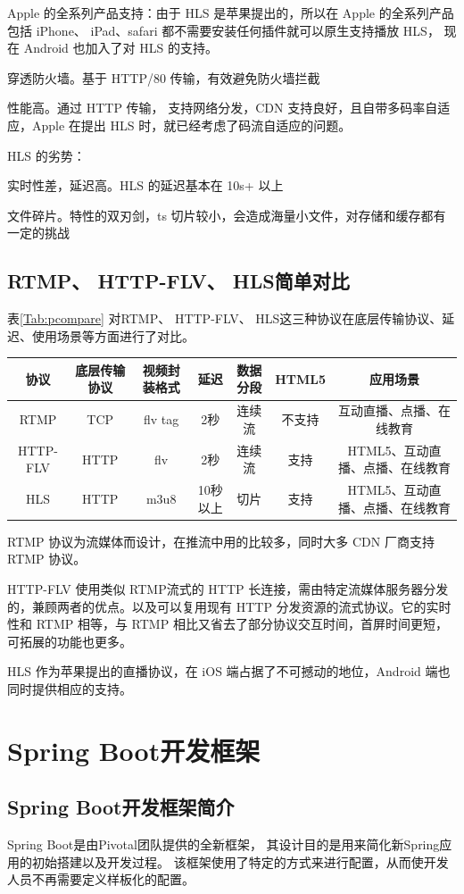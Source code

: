 Apple 的全系列产品支持：由于 HLS 是苹果提出的，所以在 Apple 的全系列产品包括 iPhone、 iPad、safari 都不需要安装任何插件就可以原生支持播放 HLS， 现在 Android 也加入了对 HLS 的支持。

穿透防火墙。基于 HTTP/80 传输，有效避免防火墙拦截

性能高。通过 HTTP 传输， 支持网络分发，CDN 支持良好，且自带多码率自适应，Apple 在提出 HLS 时，就已经考虑了码流自适应的问题。

HLS 的劣势：

实时性差，延迟高。HLS 的延迟基本在 10s+ 以上

文件碎片。特性的双刃剑，ts 切片较小，会造成海量小文件，对存储和缓存都有一定的挑战



\subsection{RTMP、 HTTP-FLV、 HLS简单对比}
表\ref{Tab:pcompare} 对RTMP、 HTTP-FLV、 HLS这三种协议在底层传输协议、延迟、使用场景等方面进行了对比。

\begin{tabular}{ccccccc}
    \caption{RTMP、 HTTP-FLV、 HLS对比}
    \label{Tab:pcompare}\\
    \toprule
    协议&底层传输协议&视频封装格式&延迟&数据分段&HTML5&应用场景\\
    \midrule
    RTMP&TCP&flv tag&2秒&连续流&不支持&互动直播、点播、在线教育\\
    HTTP-FLV&HTTP&flv&2秒&连续流&支持&HTML5、互动直播、点播、在线教育\\
    HLS&HTTP&m3u8&10秒以上&切片&支持&HTML5、互动直播、点播、在线教育\\
    \bottomrule
\end{tabular}

RTMP 协议为流媒体而设计，在推流中用的比较多，同时大多 CDN 厂商支持RTMP 协议。

HTTP-FLV 使用类似 RTMP流式的 HTTP 长连接，需由特定流媒体服务器分发的，兼顾两者的优点。以及可以复用现有 HTTP 分发资源的流式协议。它的实时性和 RTMP 相等，与 RTMP 相比又省去了部分协议交互时间，首屏时间更短，可拓展的功能也更多。

HLS 作为苹果提出的直播协议，在 iOS 端占据了不可撼动的地位，Android 端也同时提供相应的支持。
\section{Spring Boot开发框架}
\subsection{Spring Boot开发框架简介}
Spring Boot是由Pivotal团队提供的全新框架，
其设计目的是用来简化新Spring应用的初始搭建以及开发过程。
该框架使用了特定的方式来进行配置，从而使开发人员不再需要定义样板化的配置。


